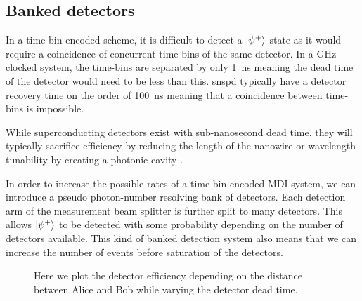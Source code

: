 \subsection{Banked detectors}

In a time-bin encoded scheme, it is difficult to detect a $\ket{\psi^+}$ state as it would require a coincidence of concurrent time-bins of the same detector. In a GHz clocked system, the time-bins are separated by only \SI{1}{\ns} meaning the dead time of the detector would need to be less than this. \ac{snspd} typically have a detector recovery time on the order of \SI{100}{\ns} meaning that a coincidence between time-bins is impossible. 

While superconducting detectors exist with sub-nanosecond dead time, they will typically sacrifice efficiency by reducing the length of the nanowire \cite{} or wavelength tunability by creating a photonic cavity \cite{}.

In order to increase the possible rates of a time-bin encoded \ac{MDI} system, we can introduce a pseudo photon-number resolving bank of detectors. Each detection arm of the measurement beam splitter is further split to many detectors. This allows $\ket{\psi^+}$ to be detected with some probability depending on the number of detectors available. This kind of banked detection system also means that we can increase the number of events before saturation of the detectors. 

\begin{figure}[tbp]
	\caption[Detector efficiency depending on detector dead time]{Here we plot the detector efficiency depending on the distance between Alice and Bob while varying the detector dead time. }
	\label{fig:det_eff_dead_time}
\end{figure}

